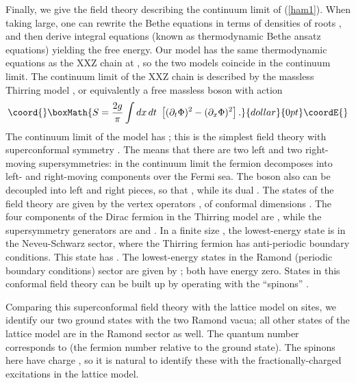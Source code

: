 \documentclass[a4paper,prl,aps,twocolumn]{revtex4}
\begin{document}
Finally, we give the field theory describing the continuum limit of
(\ref{ham1}).  When taking \coordHE{} large, one can rewrite the Bethe equations
in terms of densities of roots \cite{Bethe}, and 
then derive integral equations (known as thermodynamic Bethe
ansatz equations) yielding the free energy. Our model has the same
thermodynamic equations as the XXZ chain at
\coordHE{}, so the two models coincide in the continuum limit.  The
continuum limit of the XXZ chain is described by the massless
Thirring model \cite{hank}, or equivalently a free massless boson
\myHighlight{$\Phi$}\coordHE{} with action \cite{Friedan}
$$\coord{}\boxMath{S=\frac{2g}{\pi}\int dx\,dt\ \left[(\partial_t \Phi)^2 -
(\partial_x\Phi)^2\right].}{dollar}{0pt}\coordE{}$$ The continuum limit of the \coordHE{}
model has \coordHE{}; this is the simplest field theory with \coordHE{} superconformal symmetry \cite{Friedan}.  The \coordHE{} means
that there are two left and two right-moving supersymmetries: in the
continuum limit the fermion decomposes into left- and right-moving
components over the Fermi sea. The boson also can be decoupled into
left and right pieces, so that \coordHE{}, while its dual
\coordHE{}.  The states of the field theory are
given by the vertex operators \coordHE{}, of conformal dimensions \coordHE{}. The four components of the Dirac fermion in the Thirring
model are \coordHE{}, while the supersymmetry generators are
\coordHE{} and \coordHE{}.  In a
finite size \coordHE{}, the lowest-energy state is in the
Neveu-Schwarz sector, where the Thirring fermion has anti-periodic
boundary conditions.  This state has \coordHE{}. The
lowest-energy states in the Ramond (periodic boundary conditions)
sector are given by \coordHE{};
both have energy zero. States in this conformal field theory can
be built up by operating with the ``spinons'' \coordHE{}.

Comparing this superconformal field theory with the lattice model on
\coordHE{} sites, we identify our two \coordHE{} ground states with the two
Ramond vacua; all other states of the lattice model are in the Ramond
sector as well. The \coordHE{} quantum number \coordHE{} corresponds to \coordHE{}
(the fermion number relative to the ground state).  The spinons here
have charge \coordHE{}, so it is natural to identify these with the
fractionally-charged excitations in the lattice model.
\end{document}
